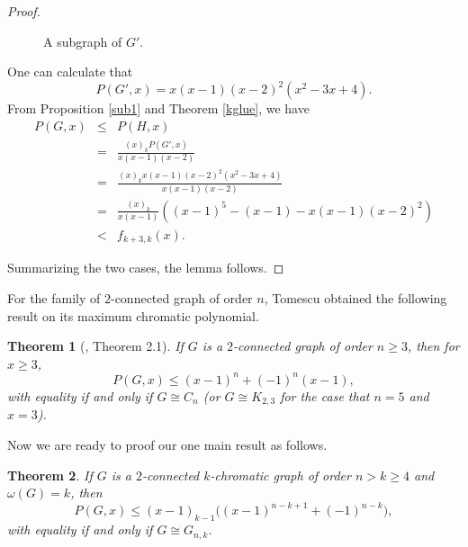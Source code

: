 \documentclass[12pt]{article}
\newtheorem{theorem}{Theorem}[section]
\theoremstyle{definition}
\begin{document}
\begin{proof}
\begin{figure}[h!]
\begin{center}
\caption{A subgraph of $G'$.}
\label{fig2}
\end{center}
\end{figure}
\noindent One can calculate that $$P(G',x)=x(x-1)(x-2)^2(x^2-3x+4).$$ From Proposition \ref{sub1} and Theorem \ref{kglue}, we have
\begin{eqnarray*}P(G,x)&\leq &P(H,x)\\
&=&\frac{(x)_kP(G',x)}{x(x-1)(x-2)}\\
&=&\frac{(x)_kx(x-1)(x-2)^2(x^2-3x+4)}{x(x-1)(x-2)}\\
&=&\frac{(x)_k}{x(x-1)}((x-1)^5-(x-1)-x(x-1)(x-2)^2)\\
&<&f_{k+3,k}(x).
\end{eqnarray*}

Summarizing the two cases, the lemma follows.
\end{proof}


For the family of $2$-connected graph of order $n$, Tomescu obtained the following result on its maximum chromatic polynomial.

\begin{theorem}[\cite{Tomescu94}, Theorem 2.1]\label{2con} If $G$ is a $2$-connected graph of order $n\geq 3$, then for $x\geq 3$,
$$P(G,x)\leq (x-1)^{n}+(-1)^n(x-1),$$ with equality if and only if $G\cong C_n$ (or $G\cong K_{2,3}$ for the case that $n=5$ and $x=3$). \end{theorem}


Now we are ready to proof our one main result as follows.

\begin{theorem}\label{t1} If $G$ is a $2$-connected $k$-chromatic graph of order $n>k\geq 4$ and $\omega(G)=k$,  then $$P(G,x)\leq (x-1)_{k-1}\big((x-1)^{n-k+1}+(-1)^{n-k}\big),$$ with equality if and only if $G\cong G_{n,k}$.
\end{theorem}
\end{document}
